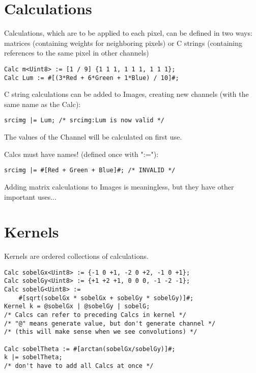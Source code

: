 \section{Calculations}

Calculations, which are to be applied to each pixel,
can be defined in two ways: 
    matrices (containing weights for neighboring pixels)
    or C strings (containing references to the same pixel in other channels)

\begin{lstlisting}[language=CLAM,escapechar=\%]
Calc m<Uint8> := [1 / 9] {1 1 1, 1 1 1, 1 1 1};
Calc Lum := #[(3*Red + 6*Green + 1*Blue) / 10]#;
\end{lstlisting}

C string calculations can be added to Images,
creating new channels (with the same name as the Calc):
\begin{lstlisting}[language=CLAM,escapechar=\%]
srcimg |= Lum; /* srcimg:Lum is now valid */
\end{lstlisting}

The values of the Channel will be calculated on first use.

Calcs must have names! (defined once with ":="):
\begin{lstlisting}[language=CLAM,escapechar=\%]
srcimg |= #[Red + Green + Blue]#; /* INVALID */
\end{lstlisting}

Adding matrix calculations to Images is meaningless,
but they have other important uses...

\section{Kernels}

Kernels are ordered collections of calculations.

\begin{lstlisting}[language=CLAM,escapechar=\%]
Calc sobelGx<Uint8> := {-1 0 +1, -2 0 +2, -1 0 +1};
Calc sobelGy<Uint8> := {+1 +2 +1, 0 0 0, -1 -2 -1};
Calc sobelG<Uint8> := 
    #[sqrt(sobelGx * sobelGx + sobelGy * sobelGy)]#;
Kernel k = @sobelGx | @sobelGy | sobelG;
/* Calcs can refer to preceding Calcs in kernel */
/* "@" means generate value, but don't generate channel */
/* (this will make sense when we see convolutions) */

Calc sobelTheta := #[arctan(sobelGx/sobelGy)]#;
k |= sobelTheta; 
/* don't have to add all Calcs at once */
\end{lstlisting}

